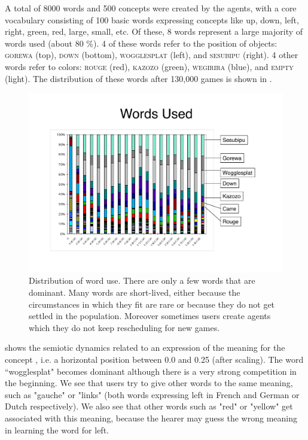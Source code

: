 A total of 8000 words and 500 concepts were created by the agents, with a core vocabulary consisting of 100 basic words expressing concepts like up, down, left, right, green, red, large, small, etc. Of these, 8 words represent a large majority of words used (about 80 \%). 4 of these words refer to the position of objects: \textsc{gorewa} (top), \textsc{down} (bottom), \textsc{wogglesplat} (left), and \textsc{sesubipu} (right). 4 other words refer to colors: \textsc{rouge} (red), \textsc{kazozo} (green), \textsc{wegirira} (blue), and \textsc{empty} (light). The distribution of these words after 130,000 games is shown in . 


\begin{figure}[htbp]
 \centerline{\includegraphics[width=\textwidth]{chap8/figures/words-used.pdf}}
\caption{\label{fig:words-used}Distribution of word use. There are only a few words that are dominant. Many words are 
short-lived, either because the circumstances 
in which they fit are rare or because they do not get settled in the population. Moreover sometimes users create agents 
which they do not keep rescheduling for new games. 
}
\end{figure}

 shows the semiotic dynamics related to an expression of the meaning for the 
concept , i.e. a horizontal position 
between 0.0 and 0.25 (after scaling). The word ``wogglesplat" becomes dominant
although there is a very strong competition in the beginning. 
We see that users try to give other words to the same meaning, such as "gauche" or "links" (both words expressing left 
in French and German or Dutch respectively). We also see that other words such as "red" or "yellow" get associated with this \enlargethispage{1\baselineskip}
meaning, because the hearer may guess the wrong meaning in learning the word for left. 

